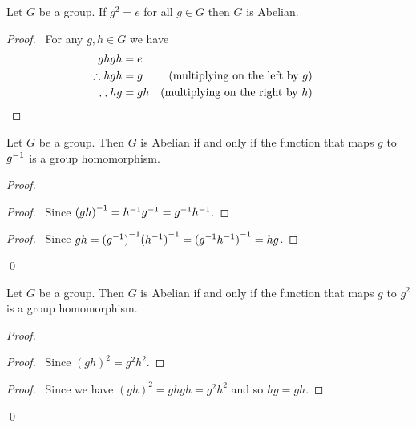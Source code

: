 \begin{prop}
    Let $G$ be a group. If $g^2 = e$ for all $g \in G$ then $G$ is Abelian.
\end{prop}

\begin{proof}
    \pf\ For any $g,h \in G$ we have
    \begin{align*}
        ghgh           & = e                                                   \\
        \therefore hgh & = g  & (\text{multiplying on the left by }g)          \\
        \therefore hg  & = gh & (\text{multiplying on the right by } h) & \qed
    \end{align*}
\end{proof}

\begin{prop}
    Let $G$ be a group. Then $G$ is Abelian if and only if the function that maps $g$ to $\inv{g}$ is a group homomorphism.
\end{prop}

\begin{proof}
    \pf
    \begin{proof}
        \pf\ Since $\inv{(gh)} = \inv{h} \inv{g} = \inv{g} \inv{h}$.
    \end{proof}
    \begin{proof}
        \pf\ Since $gh = \inv{(\inv{g})}\inv{(\inv{h})} = \inv{(\inv{g}\inv{h})} = hg$.
    \end{proof}
    \qed
\end{proof}

\begin{prop}
    Let $G$ be a group. Then $G$ is Abelian if and only if the function that maps $g$ to $g^2$ is a group homomorphism.
\end{prop}

\begin{proof}
    \pf
    \begin{proof}
        \pf\ Since $(gh)^2 = g^2h^2$.
    \end{proof}
    \begin{proof}
        \pf\ Since we have $(gh)^2 = ghgh = g^2 h^2$ and so $hg = gh$.
    \end{proof}
    \qed
\end{proof}

